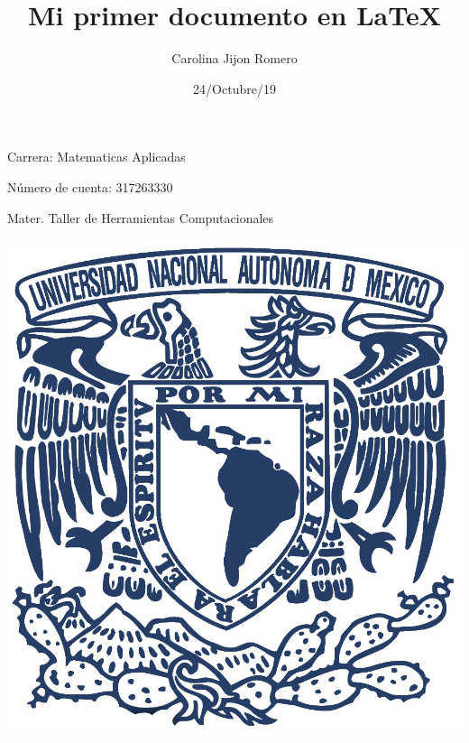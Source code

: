 \documentclass{article}%
\title{Mi primer documento en LaTeX}
\author{Carolina Jijon Romero}
\date{24/Octubre/19}
\begin{document}
	\begin{titlepage}
		\maketitle%
	\end{titlepage}

Carrera: Matematicas Aplicadas 

Número de cuenta: 317263330

Mater. Taller de Herramientas Computacionales
\vfill

\includegraphics[scale=0.50]{Imagenes/unam.jpg}
\end{document}

